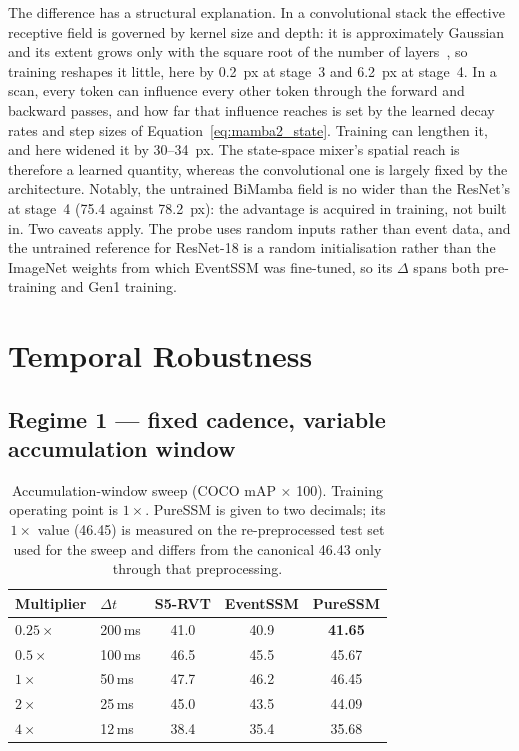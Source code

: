 \documentclass[11pt, a4paper]{report}
\begin{document}
The difference has a structural explanation. In a convolutional stack the effective receptive field is
governed by kernel size and depth: it is approximately Gaussian and its extent grows only with the
square root of the number of layers~\cite{luo2016understanding}, so training reshapes it little, here
by 0.2~px at stage~3 and 6.2~px at stage~4. In a scan, every token can influence every other token
through the forward and backward passes, and how far that influence reaches is set by the learned decay
rates and step sizes of Equation~\eqref{eq:mamba2_state}. Training can lengthen it, and here widened it
by 30--34~px. The state-space mixer's spatial reach is therefore a learned quantity, whereas the
convolutional one is largely fixed by the architecture. Notably, the untrained BiMamba field is no wider
than the ResNet's at stage~4 (75.4 against 78.2~px): the advantage is acquired in training, not built
in. Two caveats apply. The probe uses random inputs rather than event data, and the untrained reference
for ResNet-18 is a random initialisation rather than the ImageNet weights from which EventSSM was
fine-tuned, so its $\Delta$ spans both pre-training and Gen1 training.

\section{Temporal Robustness}
\label{sec:robustness}

\subsection{Regime 1 --- fixed cadence, variable accumulation window}
\begin{table}[htbp]
\centering
\caption{Accumulation-window sweep (COCO mAP $\times$ 100). Training operating point is $1\times$.
PureSSM is given to two decimals; its $1\times$ value (46.45) is measured on the re-preprocessed test set
used for the sweep and differs from the canonical 46.43 only through that preprocessing.}
\label{tab:regime1}
\begin{tabular}{llccc}
\toprule
\textbf{Multiplier} & \textbf{$\Delta t$} & \textbf{S5-RVT} & \textbf{EventSSM} & \textbf{PureSSM} \\
\midrule
$0.25\times$ & 200\,ms & 41.0 & 40.9 & \textbf{41.65} \\
$0.5\times$  & 100\,ms & 46.5 & 45.5 & 45.67 \\
$1\times$    & 50\,ms  & 47.7 & 46.2 & 46.45 \\
$2\times$    & 25\,ms  & 45.0 & 43.5 & 44.09 \\
$4\times$    & 12\,ms   & 38.4 & 35.4 & 35.68 \\
\bottomrule
\end{tabular}
\end{table}
\end{document}
